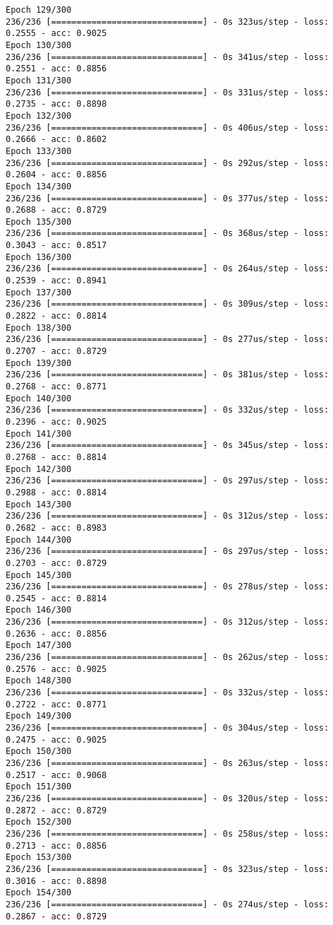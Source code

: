 \documentclass[11pt]{article}
\begin{document}
\begin{Verbatim}[commandchars=\\\{\}]
Epoch 129/300
236/236 [==============================] - 0s 323us/step - loss: 0.2555 - acc: 0.9025
Epoch 130/300
236/236 [==============================] - 0s 341us/step - loss: 0.2551 - acc: 0.8856
Epoch 131/300
236/236 [==============================] - 0s 331us/step - loss: 0.2735 - acc: 0.8898
Epoch 132/300
236/236 [==============================] - 0s 406us/step - loss: 0.2666 - acc: 0.8602
Epoch 133/300
236/236 [==============================] - 0s 292us/step - loss: 0.2604 - acc: 0.8856
Epoch 134/300
236/236 [==============================] - 0s 377us/step - loss: 0.2688 - acc: 0.8729
Epoch 135/300
236/236 [==============================] - 0s 368us/step - loss: 0.3043 - acc: 0.8517
Epoch 136/300
236/236 [==============================] - 0s 264us/step - loss: 0.2539 - acc: 0.8941
Epoch 137/300
236/236 [==============================] - 0s 309us/step - loss: 0.2822 - acc: 0.8814
Epoch 138/300
236/236 [==============================] - 0s 277us/step - loss: 0.2707 - acc: 0.8729
Epoch 139/300
236/236 [==============================] - 0s 381us/step - loss: 0.2768 - acc: 0.8771
Epoch 140/300
236/236 [==============================] - 0s 332us/step - loss: 0.2396 - acc: 0.9025
Epoch 141/300
236/236 [==============================] - 0s 345us/step - loss: 0.2768 - acc: 0.8814
Epoch 142/300
236/236 [==============================] - 0s 297us/step - loss: 0.2988 - acc: 0.8814
Epoch 143/300
236/236 [==============================] - 0s 312us/step - loss: 0.2682 - acc: 0.8983
Epoch 144/300
236/236 [==============================] - 0s 297us/step - loss: 0.2703 - acc: 0.8729
Epoch 145/300
236/236 [==============================] - 0s 278us/step - loss: 0.2545 - acc: 0.8814
Epoch 146/300
236/236 [==============================] - 0s 312us/step - loss: 0.2636 - acc: 0.8856
Epoch 147/300
236/236 [==============================] - 0s 262us/step - loss: 0.2576 - acc: 0.9025
Epoch 148/300
236/236 [==============================] - 0s 332us/step - loss: 0.2722 - acc: 0.8771
Epoch 149/300
236/236 [==============================] - 0s 304us/step - loss: 0.2475 - acc: 0.9025
Epoch 150/300
236/236 [==============================] - 0s 263us/step - loss: 0.2517 - acc: 0.9068
Epoch 151/300
236/236 [==============================] - 0s 320us/step - loss: 0.2872 - acc: 0.8729
Epoch 152/300
236/236 [==============================] - 0s 258us/step - loss: 0.2713 - acc: 0.8856
Epoch 153/300
236/236 [==============================] - 0s 323us/step - loss: 0.3016 - acc: 0.8898
Epoch 154/300
236/236 [==============================] - 0s 274us/step - loss: 0.2867 - acc: 0.8729

\end{Verbatim}
\end{document}
